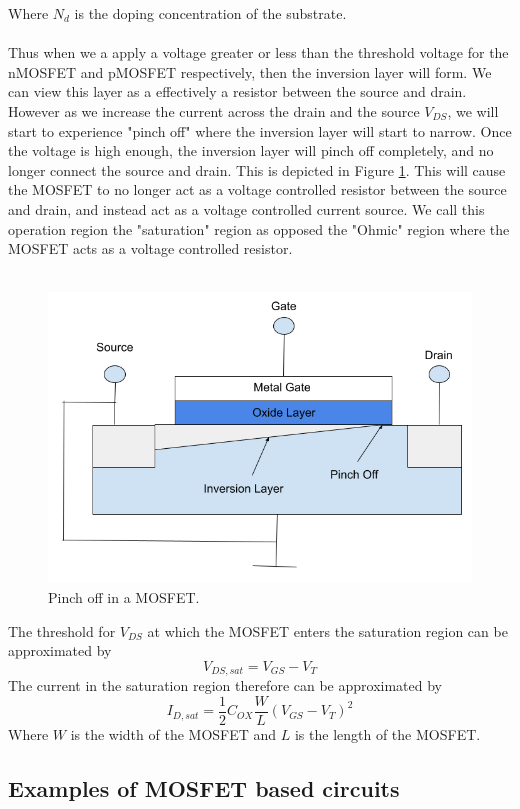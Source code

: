 \documentclass[
  reprint,
  amsmath,amssymb,
  aps
]{revtex4-1}
\begin{document}
Where $N_d$ is the doping concentration of the substrate.\\\\
Thus when we a apply a voltage greater or less than the threshold voltage for the nMOSFET and pMOSFET respectively, then the inversion layer will form. We 
can view this layer as a effectively a resistor between the source and drain. However as we increase the current across the 
drain and the source $V_{DS}$, we will start to experience "pinch off" where the inversion layer will start to narrow. Once the 
voltage is high enough, the inversion layer will pinch off completely, and no longer connect the source and drain. This is 
depicted in Figure \ref{fig:mosfet pinch off}. This will cause the MOSFET to no longer act as a voltage controlled 
resistor between the source and drain, and instead act as a voltage controlled current source. We call this 
operation region the "saturation" region as opposed the "Ohmic" region where the MOSFET acts as a voltage controlled resistor.\\\\
\begin{figure}
    \centering
    \includegraphics[width=0.5\linewidth]{mosfet_pinch_off.png}
    \caption{Pinch off in a MOSFET.}
    \label{fig:mosfet pinch off}
\end{figure}
The threshold for $V_{DS}$ at which the MOSFET enters the saturation region can be approximated by
\begin{equation}
    V_{DS,sat} = V_{GS} - V_{T}
\end{equation}
The current in the saturation region therefore can be approximated by
\begin{equation}
    I_{D,sat} = \frac{1}{2}C_{OX}\frac{W}{L}(V_{GS}-V_{T})^{2}
    \label{eq:mosfet saturation current}
\end{equation}
Where $W$ is the width of the MOSFET and $L$ is the length of the MOSFET.
\subsection*{Examples of MOSFET based circuits}
\end{document}
